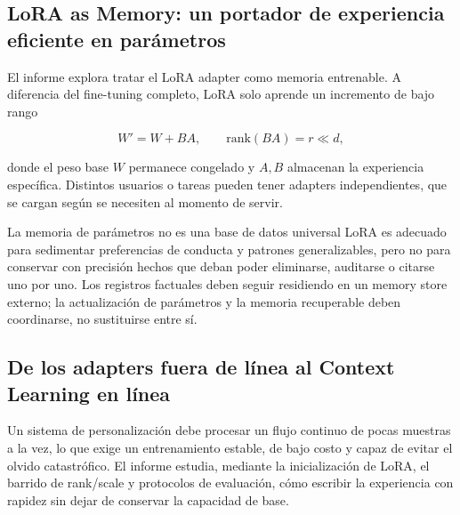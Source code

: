 \subsection{LoRA as Memory: un portador de experiencia eficiente en parámetros}

El informe explora tratar el LoRA adapter como memoria entrenable. A diferencia del fine-tuning completo, LoRA solo aprende un incremento de bajo rango

$$
W'=W+BA,\qquad \mathrm{rank}(BA)=r\ll d,
$$

donde el peso base $W$ permanece congelado y $A,B$ almacenan la experiencia específica. Distintos usuarios o tareas pueden tener adapters independientes, que se cargan según se necesiten al momento de servir.



\begin{warningbox}{La memoria de parámetros no es una base de datos universal}
LoRA es adecuado para sedimentar preferencias de conducta y patrones generalizables, pero no para conservar con precisión hechos que deban poder eliminarse, auditarse o citarse uno por uno. Los registros factuales deben seguir residiendo en un memory store externo; la actualización de parámetros y la memoria recuperable deben coordinarse, no sustituirse entre sí.
\end{warningbox}

\subsection{De los adapters fuera de línea al Context Learning en línea}

Un sistema de personalización debe procesar un flujo continuo de pocas muestras a la vez, lo que exige un entrenamiento estable, de bajo costo y capaz de evitar el olvido catastrófico. El informe estudia, mediante la inicialización de LoRA, el barrido de rank/scale y protocolos de evaluación, cómo escribir la experiencia con rapidez sin dejar de conservar la capacidad de base.


